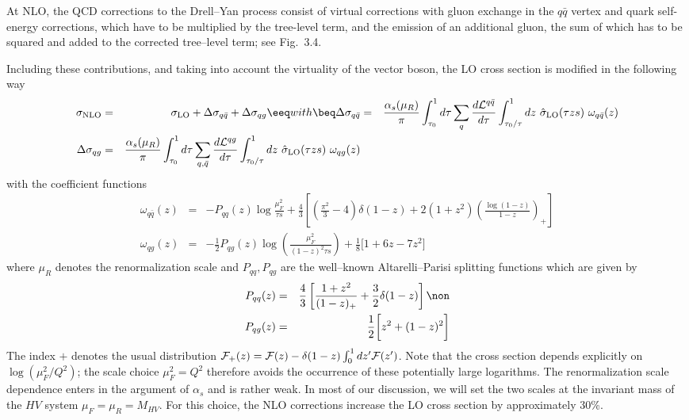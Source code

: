 At NLO, the QCD corrections to the Drell--Yan process consist of virtual
corrections with gluon exchange in the $q \bar{q}$ vertex and quark self-energy
corrections, which have to be multiplied by the tree-level term, and the
emission of an additional gluon, the sum of which has to be squared and added
to the corrected tree--level term; see Fig.~3.4. \s

Including these contributions, and taking into account the virtuality of the
vector boson, the LO cross section is modified in the following way 
\begin{eqnarray}
\sigma_{\rm NLO} & = & \sigma_{\rm LO} + \Delta\sigma_{q\bar q} +
\Delta\sigma_{qg} 
\eeq
\vspace*{-2mm}
with
\vspace*{-2mm}
\beq
\Delta\sigma_{q\bar q} & = & \frac{\alpha_s(\mu_R)}{\pi} \int_{\tau_0}^1 d\tau
\sum_q \frac{d{\cal L}^{q\bar q}}{d\tau} \int_{\tau_0/\tau}^1 dz~\hat
\sigma_{\rm LO}(\tau z s)~\omega_{q\bar q}(z) \nonumber \\
\Delta\sigma_{qg} & = & \frac{\alpha_s(\mu_R)}{\pi} \int_{\tau_0}^1 d\tau
\sum_{q,\bar q} \frac{d{\cal L}^{qg}}{d\tau} \int_{\tau_0/\tau}^1 dz~\hat
\sigma_{\rm LO}(\tau z s)~\omega_{qg}(z) 
\end{eqnarray}
with the coefficient functions \cite{DYNLO}
\begin{eqnarray}
\omega_{q\bar q}(z) & = & -P_{qq}(z) \log \frac{\mu_F^2}{\tau s}
+ \frac{4}{3}\left[ \left(\frac{\pi^2}{3} -4\right)\delta(1-z) +
2(1+z^2) \left(\frac{\log(1-z)}{1-z}\right)_+ 
\right] \nonumber \\
\omega_{qg}(z) & = & -\frac{1}{2} P_{qg}(z) \log \left(
\frac{\mu_F^2}{(1-z)^2 \tau s} \right) + \frac{1}{8}\bigg[ 1+6z-7z^2 \bigg] 
\label{AP-functions}
\end{eqnarray}
where $\mu_R$ denotes  the renormalization scale and $P_{qq}, P_{qg}$  are the
well--known Altarelli--Parisi splitting functions which are given by
\cite{apsplit,pp-APabs}
\begin{eqnarray}
P_{qq}(z)  &= & \frac{4}{3} \left[ \frac{1+z^2}{(1-z)_+}+\frac{3}{2}\delta(1-z)
\right]  \non \\ 
P_{qg}(z) & = & \frac{1}{2} \bigg[ z^2 + (1-z)^2 \bigg] 
\label{AP-function}
\end{eqnarray}
The index $+$ denotes the usual distribution ${\cal F}_+(z)={\cal F}(z)-
\delta(1-z)\int_0^1 dz' {\cal F}(z')$. Note that the cross section depends 
explicitly on $\log(\mu_F^2/Q^2)$; the scale choice $\mu_F^2 =
Q^2$ therefore avoids
the occurrence of these potentially large logarithms. The  renormalization
scale dependence enters in the argument of $\alpha_s$ and is rather weak. In
most of our discussion, we will set the two scales at the invariant mass
of the $HV$ system $\mu_F= \mu_R= M_{HV}$.
For this choice, the NLO corrections increase the LO cross section by
approximately 30\%.

